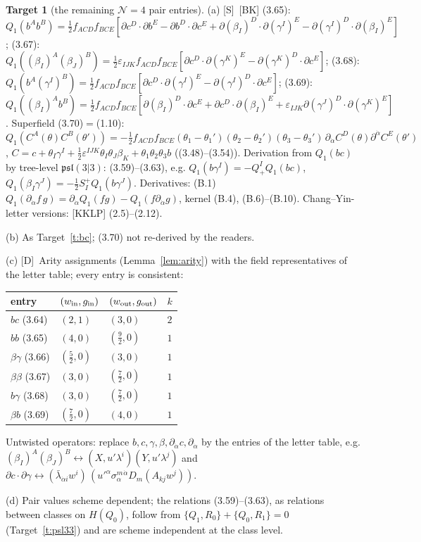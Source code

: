 \documentclass[11pt]{article}
\theoremstyle{definition}
\newtheorem{target}{Target}
\newcommand{\Sl}{\textup{[S]}}
\newcommand{\Dl}{\textup{[D]}}
\begin{document}
\begin{target}[the remaining $\mathcal N=4$ pair entries]\label{t:others}
(a) \Sl\ [BK] (3.65): $Q_1(b^Ab^B)=\tfrac12f_{ACD}f_{BCE}[\partial c^D\cdot\partial b^E-\partial b^D\cdot\partial c^E+\partial(\beta_I)^D\cdot\partial(\gamma^I)^E-\partial(\gamma^I)^D\cdot\partial(\beta_I)^E]$; (3.67): $Q_1((\beta_I)^A(\beta_J)^B)=\tfrac12\varepsilon_{IJK}f_{ACD}f_{BCE}[\partial c^D\cdot\partial(\gamma^K)^E-\partial(\gamma^K)^D\cdot\partial c^E]$; (3.68): $Q_1(b^A(\gamma^I)^B)=\tfrac12f_{ACD}f_{BCE}[\partial c^D\cdot\partial(\gamma^I)^E-\partial(\gamma^I)^D\cdot\partial c^E]$; (3.69): $Q_1((\beta_I)^Ab^B)=\tfrac12f_{ACD}f_{BCE}[\partial(\beta_I)^D\cdot\partial c^E+\partial c^D\cdot\partial(\beta_I)^E+\varepsilon_{IJK}\partial(\gamma^J)^D\cdot\partial(\gamma^K)^E]$. Superfield (3.70)$=$(1.10): $Q_1(C^A(\theta)C^B(\theta'))=-\tfrac12f_{ACD}f_{BCE}(\theta_1-\theta_1')(\theta_2-\theta_2')(\theta_3-\theta_3')\,\partial_{\dot\alpha}C^D(\theta)\partial^{\dot\alpha}C^E(\theta')$, $C=c+\theta_I\gamma^I+\frac12\varepsilon^{IJK}\theta_I\theta_J\beta_K+\theta_1\theta_2\theta_3b$ ((3.48)--(3.54)). Derivation from $Q_1(bc)$ by tree-level $\mathfrak{psl}(3|3)$: (3.59)--(3.63), e.g. $Q_1(b\gamma^I)=-Q^I_+Q_1(bc)$, $Q_1(\beta_I\gamma^J)=-\tfrac12S^+_IQ_1(b\gamma^J)$. Derivatives: (B.1) $Q_1(\partial_{\dot\alpha}f\,g)=\partial_{\dot\alpha}Q_1(fg)-Q_1(f\partial_{\dot\alpha}g)$, kernel (B.4), (B.6)--(B.10). Chang--Yin-letter versions: [KKLP] (2.5)--(2.12).

(b) As Target~\ref{t:bc}; (3.70) not re-derived by the readers.

(c) \Dl\ Arity assignments (Lemma~\ref{lem:arity}) with the field representatives of the letter table; every entry is consistent:
\begin{center}
\begin{tabular}{llll}
\toprule
entry & $(w_{\rm in},g_{\rm in})$ & $(w_{\rm out},g_{\rm out})$ & $k$\\
\midrule
$bc$ (3.64) & $(2,1)$ & $(3,0)$ & $2$\\
$bb$ (3.65) & $(4,0)$ & $(\tfrac92,0)$ & $1$\\
$\beta\gamma$ (3.66) & $(\tfrac52,0)$ & $(3,0)$ & $1$\\
$\beta\beta$ (3.67) & $(3,0)$ & $(\tfrac72,0)$ & $1$\\
$b\gamma$ (3.68) & $(3,0)$ & $(\tfrac72,0)$ & $1$\\
$\beta b$ (3.69) & $(\tfrac72,0)$ & $(4,0)$ & $1$\\
\bottomrule
\end{tabular}
\end{center}
Untwisted operators: replace $b,c,\gamma,\beta,\partial_{\dot\alpha}c,\partial_{\dot\alpha}$ by the entries of the letter table, e.g. $(\beta_I)^A(\beta_J)^B\leftrightarrow(X,u'\lambda^i)(Y,u'\lambda^j)$ and $\partial c\cdot\partial\gamma\leftrightarrow(\bar\lambda_{\dot\alpha i}w^i)\,(u'^\alpha\sigma^m_\alpha{}^{\dot\alpha}D_m(A_{kj}w^j))$.

(d) Pair values scheme dependent; the relations (3.59)--(3.63), as relations between classes on $H(Q_0)$, follow from $\{Q_1,R_0\}+\{Q_0,R_1\}=0$ (Target~\ref{t:psl33}) and are scheme independent at the class level.
\end{target}
\end{document}
